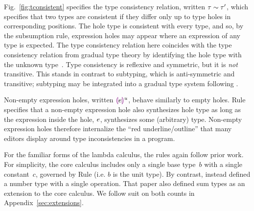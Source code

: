 

Fig.~\ref{fig:tconsistent} specifies the type consistency relation, written $\tau \sim \tau'$, which specifies that two types are consistent if they differ only up to type holes in corresponding positions.
%
The hole type is consistent with every type, and so, by the subsumption rule, expression holes may appear where an expression of any type is expected. The type consistency relation here coincides with the type consistency relation from gradual type theory by identifying the hole type with the unknown type~\cite{Siek06a}.
%
Type consistency is reflexive and symmetric, but it is \emph{not} transitive.
%
This stands in contrast to subtyping, which is anti-symmetric and transitive; subtyping may be integrated into a gradual type system following \citet{Siek:2007qy}.

Non-empty expression holes, written $\textcolor{violet}{\llparenthesis}e\textcolor{violet}{\rrparenthesis}^{u}$, behave similarly to empty holes.
%
Rule  specifies that a non-empty expression hole also synthesizes hole type as long as the expression inside the hole, $e$, synthesizes some (arbitrary) type.
%
Non-empty expression holes therefore internalize the ``red underline/outline'' that many editors display around type inconsistencies in a program.

For the familiar forms of the lambda calculus, the rules again follow prior work.
%
For simplicity, the core calculus includes only a single base type~$b$ with a single constant~$c$, governed by Rule  (i.e. $b$ is the unit type).
%
By contrast, \citet{popl-paper} instead defined a number type with a single operation. That paper also defined sum types as an extension to the core calculus. We follow suit on both counts in Appendix~\ref{sec:extensions}.
%


